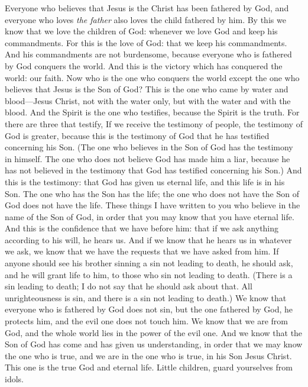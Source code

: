 \begin{biblechapter} %
\verse Everyone who believes that Jesus is the Christ has been fathered by God, and everyone who loves \textit{the father} also loves the child fathered by him.
\verse By this we know that we love the children of God: whenever we love God and keep his commandments.
\verse For this is the love of God: that we keep his commandments. And his commandments are not burdensome,
\verse because everyone who is fathered by God conquers the world.
 And this is the victory which has conquered the world: our faith.
\verse Now who is the one who conquers the world except the one who believes that Jesus is the Son of God?
\verse This is the one who came by water and blood—Jesus Christ, not with the water only, but with the water and with the blood. And the Spirit is the one who testifies, because the Spirit is the truth.
\verse For there are three that testify,
\verse If we receive the testimony of people, the testimony of God is greater, because this is the testimony of God that he has testified concerning his Son.
\verse (The one who believes in the Son of God has the testimony in himself. The one who does not believe God has made him a liar, because he has not believed in the testimony that God has testified concerning his Son.)
\verse And this is the testimony: that God has given us eternal life, and this life is in his Son.
\verse The one who has the Son has the life; the one who does not have the Son of God does not have the life.
 These things I have written to you who believe in the name of the Son of God, in order that you may know that you have eternal life.
\verse And this is the confidence that we have before him: that if we ask anything according to his will, he hears us.
\verse And if we know that he hears us in whatever we ask, we know that we have the requests that we have asked from him.
\verse If anyone should see his brother sinning a sin not leading to death, he should ask, and he will grant life to him, to those who sin not leading to death. (There is a sin leading to death; I do not say that he should ask about that.
\verse All unrighteousness is sin, and there is a sin not leading to death.)
\verse We know that everyone who is fathered by God does not sin, but the one fathered by God, he protects him, and the evil one does not touch him.
\verse We know that we are from God, and the whole world lies in the power of the evil one.
\verse And we know that the Son of God has come and has given us understanding, in order that we may know the one who is true, and we are in the one who is true, in his Son Jesus Christ. This one is the true God and eternal life.
\verse Little children, guard yourselves from idols.
\end{biblechapter}

